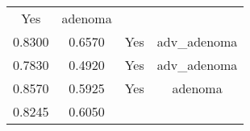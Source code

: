 \documentclass[12pt,]{article}
\begin{document}
\begin{longtable}[]{@{}cccc@{}}
\begin{minipage}[t]{0.22\columnwidth}
Yes\strut
\end{minipage} & \begin{minipage}[t]{0.16\columnwidth}\centering\strut
adenoma\strut
\end{minipage}\tabularnewline
\begin{minipage}[t]{0.24\columnwidth}\centering\strut
0.8300\strut
\end{minipage} & \begin{minipage}[t]{0.26\columnwidth}\centering\strut
0.6570\strut
\end{minipage} & \begin{minipage}[t]{0.22\columnwidth}\centering\strut
Yes\strut
\end{minipage} & \begin{minipage}[t]{0.16\columnwidth}\centering\strut
adv\_adenoma\strut
\end{minipage}\tabularnewline
\begin{minipage}[t]{0.24\columnwidth}\centering\strut
0.7830\strut
\end{minipage} & \begin{minipage}[t]{0.26\columnwidth}\centering\strut
0.4920\strut
\end{minipage} & \begin{minipage}[t]{0.22\columnwidth}\centering\strut
Yes\strut
\end{minipage} & \begin{minipage}[t]{0.16\columnwidth}\centering\strut
adv\_adenoma\strut
\end{minipage}\tabularnewline
\begin{minipage}[t]{0.24\columnwidth}\centering\strut
0.8570\strut
\end{minipage} & \begin{minipage}[t]{0.26\columnwidth}\centering\strut
0.5925\strut
\end{minipage} & \begin{minipage}[t]{0.22\columnwidth}\centering\strut
Yes\strut
\end{minipage} & \begin{minipage}[t]{0.16\columnwidth}\centering\strut
adenoma\strut
\end{minipage}\tabularnewline
\begin{minipage}[t]{0.24\columnwidth}\centering\strut
0.8245\strut
\end{minipage} & \begin{minipage}[t]{0.26\columnwidth}\centering\strut
0.6050\strut
\end{minipage} & \begin{minipage}[t]{0.22\columnwidth}\centering\strut

\end{minipage}
\end{longtable}
\end{document}
